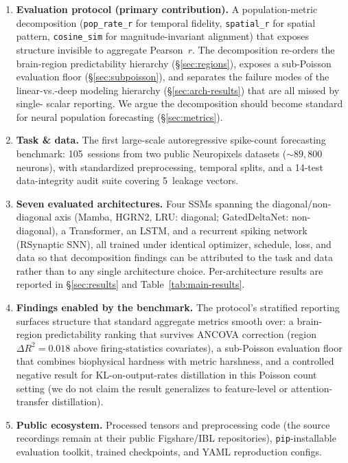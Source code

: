 \documentclass{article}
\begin{document}
\begin{enumerate}[nosep, leftmargin=*]
  \item \textbf{Evaluation protocol (primary contribution).}
    A population-metric decomposition (\texttt{pop\_rate\_r}
    for temporal fidelity, \texttt{spatial\_r} for spatial pattern,
    \texttt{cosine\_sim} for magnitude-invariant alignment) that
    exposes structure invisible to aggregate Pearson~$r$.  The
    decomposition re-orders the brain-region predictability hierarchy
    (\S\ref{sec:regions}), exposes a sub-Poisson evaluation floor
    (\S\ref{sec:subpoisson}), and separates the failure modes of the
    linear-vs.-deep modeling hierarchy
    (\S\ref{sec:arch-results}) that are all missed by single-
    scalar reporting.  We argue the decomposition should become
    standard for neural population forecasting (\S\ref{sec:metrics}).
  \item \textbf{Task \& data.}  The first large-scale autoregressive
    spike-count forecasting benchmark: 105~sessions from two public
    Neuropixels datasets (${\sim}89{,}800$ neurons), with standardized
    preprocessing, temporal splits, and a 14-test data-integrity audit
    suite covering 5~leakage vectors.
  \item \textbf{Seven evaluated architectures.}
    Four SSMs spanning the diagonal/non-diagonal axis (Mamba, HGRN2,
    LRU: diagonal; GatedDeltaNet: non-diagonal), a Transformer,
    an LSTM, and a recurrent spiking network (RSynaptic SNN), all
    trained under identical optimizer, schedule, loss, and data so
    that decomposition findings can be attributed to the task and
    data rather than to any single architecture choice.  Per-architecture
    results are reported in \S\ref{sec:results} and Table~\ref{tab:main-results}.
  \item \textbf{Findings enabled by the benchmark.}  The protocol's
    stratified reporting surfaces structure that standard aggregate
    metrics smooth over: a brain-region predictability ranking that
    survives ANCOVA correction (region $\Delta R^{2}{=}0.018$ above
    firing-statistics covariates), a sub-Poisson evaluation floor
    that combines biophysical hardness with metric harshness, and a
    controlled negative result for KL-on-output-rates distillation
    in this Poisson count setting (we do not claim the result
    generalizes to feature-level or attention-transfer distillation).
  \item \textbf{Public ecosystem.}  Processed tensors and
    preprocessing code (the source recordings remain at their
    public Figshare/IBL repositories), \texttt{pip}-installable
    evaluation toolkit, trained checkpoints, and YAML reproduction
    configs.
\end{enumerate}
\end{document}
